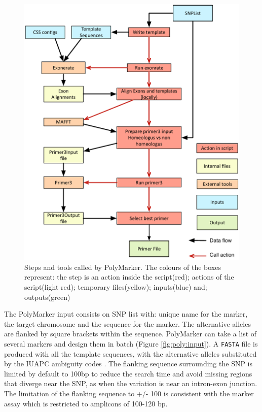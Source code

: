 \begin{figure}
\includegraphics[width=1\textwidth]{PolyMarker/Figures/pipeline.pdf}
\caption[Steps and tools called by PolyMarker]{Steps and tools called by PolyMarker. The colours of the boxes represent: the step is an action inside the script(red); actions of the script(light red); temporary files(yellow); inputs(blue) and; outputs(green)}
\label{fig:poly:pipeline}
\end{figure}

The PolyMarker input consists on SNP list with: unique name for the marker, the target chromosome and the sequence for the marker. 
The alternative alleles are flanked by square brackets within the sequence. PolyMarker can take a list of several markers and design them in batch (Figure \ref{fig:poly:input}). 
A \verb|FASTA| file is produced with all the template sequences, with the alternative alleles substituted by the IUAPC ambiguity codes \citep{Cornish-Bowden1985}. 
The flanking sequence surrounding the SNP is limited by default to 100bp to reduce the search time and avoid missing regions that diverge near the SNP, as when the variation is near an intron-exon junction. 
The limitation of the flanking sequence to +/- 100 is consistent with the marker assay which is restricted to amplicons of 100-120 bp. 

